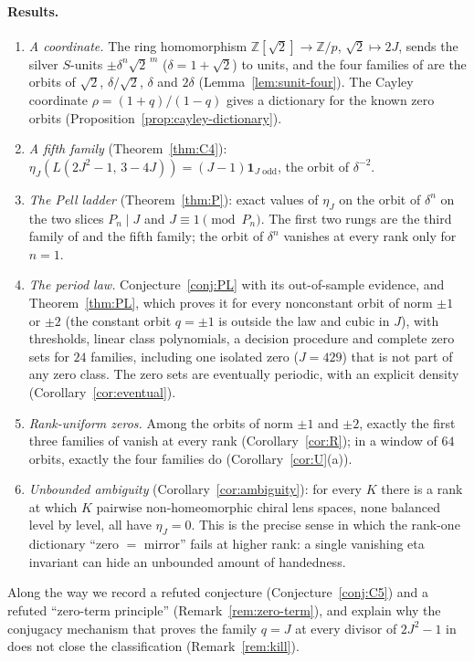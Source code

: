 \documentclass[11pt]{article}
\theoremstyle{definition}
\newcommand{\Z}{\mathbb Z}
\newcommand{\ind}{\mathbf 1}
\begin{document}
\paragraph{Results.}
\begin{enumerate}[label=(\arabic*)]
\item \emph{A coordinate.}  The ring homomorphism
$\Z[\sqrt2]\to\Z/p$, $\sqrt2\mapsto2J$, sends the silver $S$-units
$\pm\delta^n\sqrt2^{\,m}$ ($\delta=1+\sqrt2$) to units, and the four
families of \cite{MahmoodP1Collection2026} are the orbits of $\sqrt2$,
$\delta/\sqrt2$, $\delta$ and $2\delta$ (Lemma~\ref{lem:sunit-four}).
The Cayley coordinate $\rho=(1+q)/(1-q)$ gives a dictionary for the
known zero orbits (Proposition~\ref{prop:cayley-dictionary}).
\item \emph{A fifth family} (Theorem~\ref{thm:C4}):
$\eta_J(L(2J^2-1,\,3-4J))=(J-1)\ind_{J\text{ odd}}$, the orbit of
$\delta^{-2}$.
\item \emph{The Pell ladder} (Theorem~\ref{thm:P}): exact values of
$\eta_J$ on the orbit of $\delta^n$ on the two slices $P_n\mid J$ and
$J\equiv1\pmod{P_n}$.  The first two rungs are the third family of
\cite{MahmoodP1Collection2026} and the fifth family; the orbit of
$\delta^n$ vanishes at every rank only for $n=1$.
\item \emph{The period law.}  Conjecture~\ref{conj:PL} with its out-of-sample
evidence, and Theorem~\ref{thm:PL}, which proves it for every nonconstant
orbit of norm $\pm1$ or $\pm2$ (the constant orbit $q=\pm1$ is outside
the law and cubic in $J$), with thresholds, linear class polynomials, a
decision procedure and complete zero sets for $24$ families, including one isolated zero
($J=429$) that is not part of any zero class.  The zero sets are
eventually periodic, with an explicit density
(Corollary~\ref{cor:eventual}).
\item \emph{Rank-uniform zeros.}  Among the orbits of norm $\pm1$ and
$\pm2$, exactly the first three families of
\cite{MahmoodP1Collection2026} vanish at every rank
(Corollary~\ref{cor:R}); in a window of $64$ orbits, exactly the four
families do (Corollary~\ref{cor:U}(a)).
\item \emph{Unbounded ambiguity} (Corollary~\ref{cor:ambiguity}): for
every $K$ there is a rank at which $K$ pairwise non-homeomorphic chiral
lens spaces, none balanced level by level, all have $\eta_J=0$.  This is
the precise sense in which the rank-one dictionary ``zero $=$ mirror''
fails at higher rank: a single vanishing eta invariant can hide an
unbounded amount of handedness.
\end{enumerate}
Along the way we record a refuted conjecture (Conjecture~\ref{conj:C5})
and a refuted ``zero-term principle'' (Remark~\ref{rem:zero-term}), and
explain why the conjugacy mechanism that proves the family $q=J$ at every
divisor of $2J^2-1$ in \cite{LensChirality2026} does not close the
classification (Remark~\ref{rem:kill}).
\end{document}

